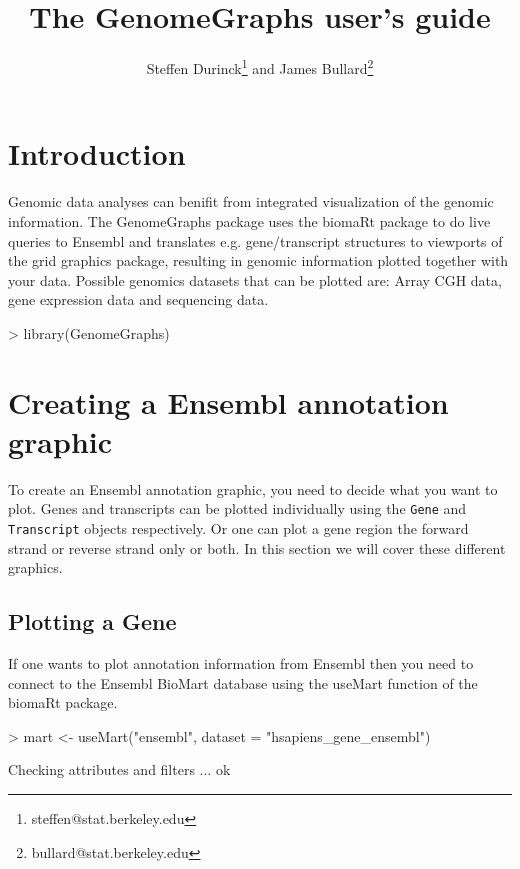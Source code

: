 \documentclass[11pt]{article}
\author{Steffen Durinck\footnote{steffen@stat.berkeley.edu} and James
  Bullard\footnote{bullard@stat.berkeley.edu}}
\newcommand{\Robject}[1]{{\texttt{#1}}}
\begin{document}
\title{The GenomeGraphs user's guide}

\maketitle

\tableofcontents
\section{Introduction}

Genomic data analyses can benifit from integrated visualization of the
genomic information.  The GenomeGraphs package uses the biomaRt
package to do live queries to Ensembl and translates
e.g. gene/transcript structures to viewports of the grid graphics
package, resulting in genomic information plotted together with your
data.  Possible genomics datasets that can be plotted are: Array CGH
data, gene expression data and sequencing data.

\begin{Schunk}
\begin{Sinput}
> library(GenomeGraphs)
\end{Sinput}
\end{Schunk}

\section{Creating a Ensembl annotation graphic}

To create an Ensembl annotation graphic, you need to decide what you
want to plot.  Genes and transcripts can be plotted individually using
the \Robject{Gene} and \Robject{Transcript} objects respectively.  Or
one can plot a gene region the forward strand or reverse strand only
or both.  In this section we will cover these different graphics.

\subsection{Plotting a Gene}

If one wants to plot annotation information from Ensembl then you need
to connect to the Ensembl BioMart database using the useMart function
of the biomaRt package.

\begin{Schunk}
\begin{Sinput}
> mart <- useMart("ensembl", dataset = "hsapiens_gene_ensembl")
\end{Sinput}
\begin{Soutput}
Checking attributes and filters ... ok
\end{Soutput}
\end{Schunk}
\end{document}
